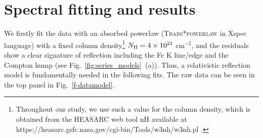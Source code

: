 \documentclass[11pt,a4paper,pdftex]{article}
\begin{document}


\section{Spectral fitting and results}\label{fitting}

We firstly fit the data with an absorbed powerlaw (\textsc{Tbabs*powerlaw} in {\sc Xspec} language) with a fixed column density\footnote{Throughout our study, we use such a value for the column density, which is obtained from the HEASARC web tool nH available at
https://heasarc.gsfc.nasa.gov/cgi-bin/Tools/w3nh/w3nh.pl \cite{Bekhti:2016}.} $N_{\rm H} = 4\times10^{21}$ cm$^{-2}$, and the residuals show a clear signature of reflection including the Fe K line/edge and the Compton hump (see Fig.~\ref{fig:series_models}~(a)). Thus, a relativistic reflection model is fundamentally needed in the following fits. The raw data can be seen in the top panel in Fig.~\ref{f-datamodel}.
\end{document}
